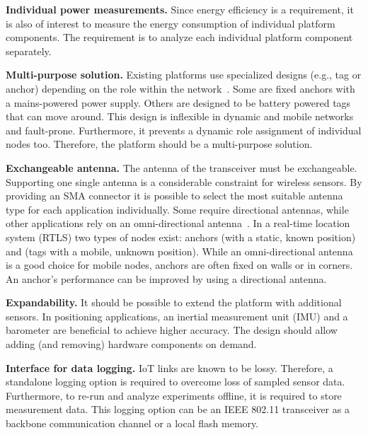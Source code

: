 \documentclass[journal,comsoc]{IEEEtran}
\begin{document}
\vspace*{0.5em}
\noindent\textbf{Individual power measurements.} Since energy efficiency is a requirement, it is also of interest to measure the energy consumption of individual platform components. 
The requirement is to analyze each individual platform component separately. 

\vspace*{0.5em}
\noindent\textbf{Multi-purpose solution.} %
Existing platforms use specialized designs (e.g., tag or anchor) depending on the role within the network~\cite{openrtlswebsite,sequiturwebsite,sewiowebsite,pozyxwebsite}. 
Some are fixed anchors with a mains-powered power supply. 
Others are designed to be battery powered tags that can move around. 
This design is inflexible in dynamic and mobile networks and fault-prone. 
Furthermore, it prevents a dynamic role assignment of individual nodes too. 
Therefore, the platform should be a multi-purpose solution. 

\vspace*{0.5em}
\noindent\textbf{Exchangeable antenna.} The antenna of the transceiver must be exchangeable. 
Supporting one single antenna is a considerable constraint for wireless sensors. 
By providing an SMA connector it is possible to select the most suitable antenna type for each application individually. 
Some require directional antennas, while other applications rely on an omni-directional antenna~\cite{Grosswindhager_Switchable_2017}. 
In a real-time location system (RTLS) two types of nodes exist: anchors (with a static, known position) and (tags with a mobile, unknown position). 
While an omni-directional antenna is a good choice for mobile nodes, anchors are often fixed on walls or in corners.  
An anchor's performance can be improved by using a directional antenna.

\vspace*{0.5em}
\noindent\textbf{Expandability.} It should be possible to extend the platform with additional sensors. 
In positioning applications, an inertial measurement unit (IMU) and a barometer are beneficial to achieve higher accuracy. 
The design should allow adding (and removing) hardware components on demand. 

\vspace*{0.5em}
\noindent\textbf{Interface for data logging.} IoT links are known to be lossy.
Therefore, a standalone logging option is required to overcome loss of sampled sensor data. 
Furthermore, to re-run and analyze experiments offline, it is required to store measurement data. 
This logging option can be an IEEE 802.11 transceiver as a backbone communication channel or a local flash memory.
\end{document}
